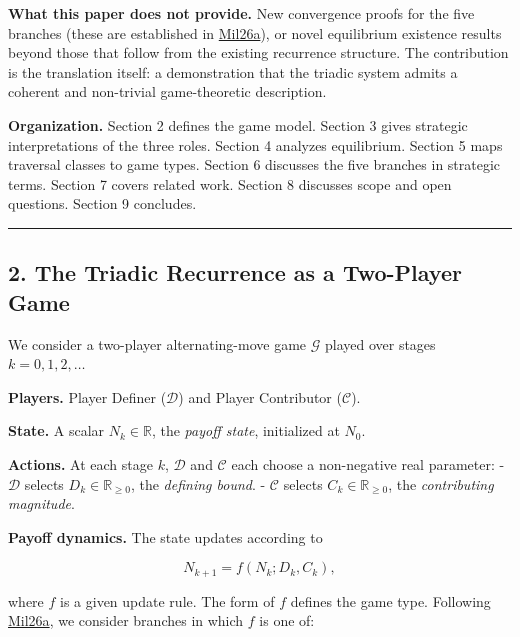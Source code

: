 \documentclass[
  11pt,
  letterpaper,
]{article}
\begin{document}
\textbf{What this paper does not provide.} New convergence proofs for
the five branches (these are established in
\href{https://github.com/baardev/truevalue/blob/main/docnav/Research/papers/1_recursive-tholonic-five-constants/1_recursive-tholonic-five-constants.pdf}{Mil26a}),
or novel equilibrium existence results beyond those that follow from the
existing recurrence structure. The contribution is the translation
itself: a demonstration that the triadic system admits a coherent and
non-trivial game-theoretic description.

\textbf{Organization.} Section 2 defines the game model. Section 3 gives
strategic interpretations of the three roles. Section 4 analyzes
equilibrium. Section 5 maps traversal classes to game types. Section 6
discusses the five branches in strategic terms. Section 7 covers related
work. Section 8 discusses scope and open questions. Section 9 concludes.

\begin{center}\rule{0.5\linewidth}{0.5pt}\end{center}

\subsection{2. The Triadic Recurrence as a Two-Player
Game}\label{the-triadic-recurrence-as-a-two-player-game}

We consider a two-player alternating-move game \(\mathcal{G}\) played
over stages \(k = 0, 1, 2, \ldots\)

\textbf{Players.} Player Definer (\(\mathcal{D}\)) and Player
Contributor (\(\mathcal{C}\)).

\textbf{State.} A scalar \(N_k \in \mathbb{R}\), the \emph{payoff
state}, initialized at \(N_0\).

\textbf{Actions.} At each stage \(k\), \(\mathcal{D}\) and
\(\mathcal{C}\) each choose a non-negative real parameter: -
\(\mathcal{D}\) selects \(D_k \in \mathbb{R}_{\geq 0}\), the
\emph{defining bound}. - \(\mathcal{C}\) selects
\(C_k \in \mathbb{R}_{\geq 0}\), the \emph{contributing magnitude}.

\textbf{Payoff dynamics.} The state updates according to

\[N_{k+1} = f(N_k; D_k, C_k),\]

where \(f\) is a given update rule. The form of \(f\) defines the game
type. Following
\href{https://github.com/baardev/truevalue/blob/main/docnav/Research/papers/1_recursive-tholonic-five-constants/1_recursive-tholonic-five-constants.pdf}{Mil26a},
we consider branches in which \(f\) is one of:
\end{document}
